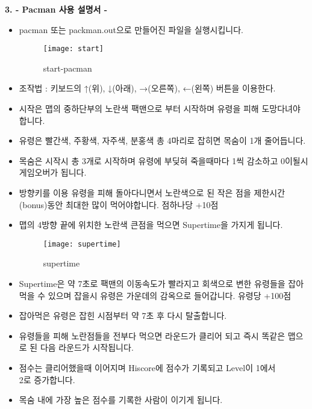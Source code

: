 \documentclass{article}
\begin{document}
\newpage
\begin{large}\textbf{3. - Pacman 사용 설명서 -}\end{large}
\begin{itemize}
\item pacman 또는 packman.out으로 만들어진 파일을 실행시킵니다.
\begin{figure}[!h]
\centering
\texttt{[image: start]}
\caption{start-pacman}%
\end{figure}
\item 조작법 : 키보드의 ↑(위), ↓(아래), →(오른쪽), ←(왼쪽) 버튼을 이용한다.
\item 시작은 맵의 중하단부의 노란색 팩맨으로 부터 시작하며 유령을 피해 도망다녀야 합니다.
\item 유령은 빨간색, 주황색, 자주색, 분홍색 총 4마리로 잡히면 목숨이 1개 줄어듭니다.
\item 목숨은 시작시 총 3개로 시작하며 유령에 부딪혀 죽을때마다 1씩 감소하고 0이될시 게임오버가 됩니다.
\item 방향키를 이용 유령을 피해 돌아다니면서 노란색으로 된 작은 점을 제한시간(bonus)동안 최대한 많이 먹어야합니다. 점하나당 +10점
\item 맵의 4방향 끝에 위치한 노란색 큰점을 먹으면 Supertime을 가지게 됩니다.
\newpage

\begin{figure}[!h]
\centering
\texttt{[image: supertime]}
\caption{supertime}%
\end{figure}

\item Supertime은 약 7초로 팩맨의 이동속도가 빨라지고 회색으로 변한 유령들을 잡아먹을 수 있으며 잡을시 유령은 가운데의 감옥으로 들어갑니다. 유령당 +100점
\item 잡아먹은 유령은 잡힌 시점부터 약 7초 후 다시 탈출합니다.
\item 유령들을 피해 노란점들을 전부다 먹으면 라운드가 클리어 되고 즉시 똑같은 맵으로 된 다음 라운드가 시작됩니다.
\item 점수는 클리어했을때 이어지며 Hiscore에 점수가 기록되고 Level이 1에서\\ 2로 증가합니다.
\item 목숨 내에 가장 높은 점수를 기록한 사람이 이기게 됩니다.
\end{itemize}
\end{document}
